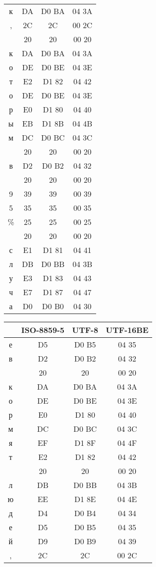 \begin{center}
\begin{tabular}{|c|c|c|c|}
к & DA & D0 BA & 04 3A\\
, & 2C & 2C & 00 2C\\
& 20 & 20 & 00 20\\
к & DA & D0 BA & 04 3A\\
о & DE & D0 BE & 04 3E\\
т & E2 & D1 82 & 04 42\\
о & DE & D0 BE & 04 3E\\
р & E0 & D1 80 & 04 40\\
ы & EB & D1 8B & 04 4B\\
м & DC & D0 BC & 04 3C\\
& 20 & 20 & 00 20\\
в & D2 & D0 B2 & 04 32\\
& 20 & 20 & 00 20\\
9 & 39 & 39 & 00 39\\
5 & 35 & 35 & 00 35\\
\% & 25 & 25 & 00 25\\
& 20 & 20 & 00 20\\
с & E1 & D1 81 & 04 41\\
л & DB & D0 BB & 04 3B\\
у & E3 & D1 83 & 04 43\\
ч & E7 & D1 87 & 04 47\\
а & D0 & D0 B0 & 04 30\\
\hline
\end{tabular}
\quad
\begin{tabular}{|c|c|c|c|}
\hline
 & ISO-8859-5 & UTF-8 & UTF-16BE\\
\hline
е & D5 & D0 B5 & 04 35\\
в & D2 & D0 B2 & 04 32\\
& 20 & 20 & 00 20\\
к & DA & D0 BA & 04 3A\\
о & DE & D0 BE & 04 3E\\
р & E0 & D1 80 & 04 40\\
м & DC & D0 BC & 04 3C\\
я & EF & D1 8F & 04 4F\\
т & E2 & D1 82 & 04 42\\
& 20 & 20 & 00 20\\
л & DB & D0 BB & 04 3B\\
ю & EE & D1 8E & 04 4E\\
д & D4 & D0 B4 & 04 34\\
е & D5 & D0 B5 & 04 35\\
й & D9 & D0 B9 & 04 39\\
, & 2C & 2C & 00 2C\\

\end{tabular}
\end{center}
